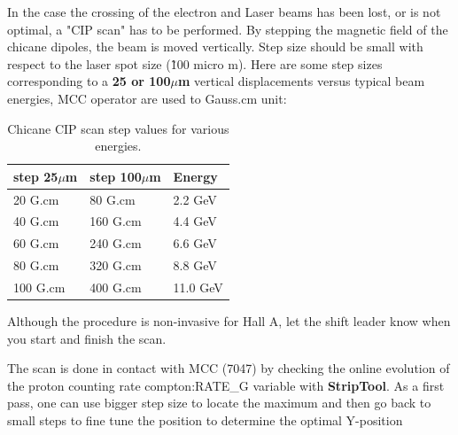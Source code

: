         In the case the crossing of the electron and Laser beams
        has been lost, or is not optimal, a "CIP scan" has to be performed.
        By stepping the magnetic field of the
        chicane dipoles, the beam is moved vertically. Step size should be
        small with respect to the laser spot size (\~100 micro m). Here are some
        step sizes corresponding to a {\bf 25 or 100$\mu$m  } vertical displacements versus
        typical beam energies, MCC operator are used to Gauss.cm unit:
\begin{table}[ht]
\begin{center}
\begin{tabular}{|l|l|l|} \hline
step 25$\mu$m & step 100$\mu$m & Energy \\ \hline\hline
20 G.cm & 80 G.cm & 2.2 GeV \\ \hline
40 G.cm &  160 G.cm &  4.4 GeV \\ \hline
60 G.cm &  240 G.cm & 6.6  GeV \\ \hline
80 G.cm &  320 G.cm &  8.8 GeV \\ \hline
100 G.cm &  400 G.cm &  11.0 GeV \\ \hline 
\end{tabular}
\end{center}
\caption[Compton:vertical scan]{Chicane CIP  scan step values for various energies.
}
\label{tab:compton_vscan}
\end{table}
	
Although the procedure is non-invasive for Hall A, let the shift leader know
when you start and finish the scan.

The scan is done in contact with MCC (7047) by checking the online evolution
        of the proton counting rate compton:RATE\_G variable with  {\bf StripTool}.
        As a first pass, one can use bigger step size to locate
        the maximum and then go back to small steps to fine tune the position to determine 
        the optimal Y-position

